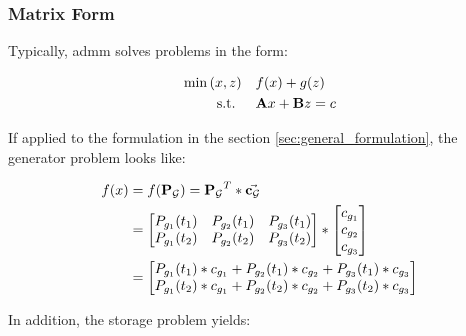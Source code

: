  

\subsubsection{Matrix Form}

Typically, \gls{admm} solves problems in the form:

\begin{subequations}
	\begin{align}
		\min{(x, z)} \quad & f(x) + g(z) \\
		\text{s.t. } \quad & \vb{A}x + \vb{B}z = c
	\end{align}
\end{subequations}

If applied to the formulation in the section \ref{sec:general_formulation}, the generator problem looks like:

\begin{subequations}
	\begin{align}
		f(x) &= f(\vb{P_\mathcal{G}}) = \vb{P_\mathcal{G}}^T * \va{c_\mathcal{G}}\\
		& = \begin{bmatrix}
			P_{g_1}(t_1) & P_{g_2}(t_1) & P_{g_3}(t_1) \\
			P_{g_1}(t_2) & P_{g_2}(t_2) & P_{g_3}(t_2)
		\end{bmatrix} * \begin{bmatrix}
			c_{g_1} \\
			c_{g_2} \\
			c_{g_3}
		\end{bmatrix} \\
		& = \begin{bmatrix}
			P_{g_1}(t_1) * c_{g_1} + P_{g_2}(t_1) * c_{g_2} + P_{g_3}(t_1) * c_{g_3} \\
			P_{g_1}(t_2) * c_{g_1} + P_{g_2}(t_2) * c_{g_2} + P_{g_3}(t_2) * c_{g_3} \\
		\end{bmatrix}
	\end{align}
\end{subequations}

In addition, the storage problem yields:

